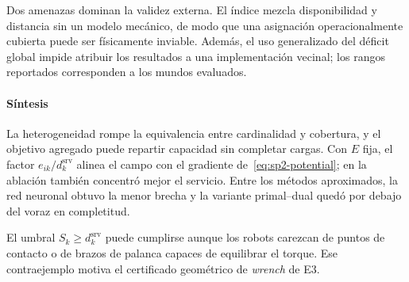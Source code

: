 Dos amenazas dominan la validez externa. El índice mezcla disponibilidad y distancia sin un modelo mecánico, de modo que una asignación operacionalmente cubierta puede ser físicamente inviable. Además, el uso generalizado del déficit global impide atribuir los resultados a una implementación vecinal; los rangos reportados corresponden a los mundos evaluados.

\paragraph{Síntesis}

La heterogeneidad rompe la equivalencia entre cardinalidad y cobertura, y el objetivo agregado puede repartir capacidad sin completar cargas. Con $E$ fija, el factor $e_{ik}/d_k^{\mathrm{srv}}$ alinea el campo con el gradiente de~\eqref{eq:sp2-potential}; en la ablación también concentró mejor el servicio. Entre los métodos aproximados, la red neuronal obtuvo la menor brecha y la variante primal--dual quedó por debajo del voraz en completitud.

El umbral $S_k\geq d_k^{\mathrm{srv}}$ puede cumplirse aunque los robots carezcan de puntos de contacto o de brazos de palanca capaces de equilibrar el torque. Ese contraejemplo motiva el certificado geométrico de \emph{wrench} de E3.
